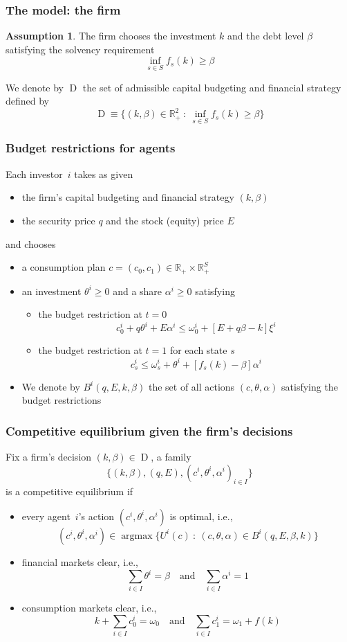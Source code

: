 \documentclass[blue]{beamer}
\def\R{\mathbb{R}}
\def\leq{\leqslant}
\def\geq{\geqslant}
\def\et{\quad \textrm{and} \quad}
\DeclareMathOperator\argmax{argmax}
\DeclareMathOperator\A{D}
\theoremstyle{definition}
\newtheorem*{assumption}{Assumption}
\theoremstyle{example}
\begin{document}
\begin{frame}\frametitle{The model: the firm}
\begin{assumption}
The firm chooses the investment $k$ and the debt level $\beta$ satisfying the solvency requirement
\[
\inf_{s\in S} f_s(k) \geq \beta
\]
\end{assumption}
We denote by $\A$ the set of admissible capital budgeting and financial strategy defined by
\[
\A \equiv \{(k,\beta) \in \R^2_+ \ \colon \ \inf_{s\in S} f_s(k) \geq \beta \}
\]
\end{frame}
\begin{frame}\frametitle{Budget restrictions for agents}
Each investor~$i$ takes as given
\begin{itemize}
\item the firm's capital budgeting and financial strategy $(k,\beta)$
\item the security price $q$ and the stock (equity) price $E$
\end{itemize}
and chooses
\begin{itemize}
\item a consumption plan $c=(c_0,c_1) \in \R_+ \times \R_+^S$
\item an investment $\theta^i\geq 0$ and a share $\alpha^i \geq 0$ satisfying
\begin{itemize}
\item the budget restriction at $t=0$
\[
c^i_0 + q \theta^i + E \alpha^i \leq \omega^i_0 + [E+q\beta - k] \xi^i
\]
\item the budget restriction at $t=1$ for each state $s$
\[
c^i_s \leq \omega^i_s + \theta^i + [f_s(k) - \beta] \alpha^i
\]
\end{itemize}
\item We denote by $B^i(q,E,k,\beta)$ the set of all actions $(c,\theta,\alpha)$ satisfying the budget restrictions
\end{itemize}
\end{frame}
\begin{frame}\frametitle{Competitive equilibrium given the firm's decisions}
Fix a firm's decision $(k,\beta) \in \A$, a family
\[
\{(k,\beta),(q,E),(c^i,\theta^i,\alpha^i)_{i\in I}\}
\]
is a competitive equilibrium if
\begin{itemize}
\item every agent~$i$'s action $(c^i,\theta^i,\alpha^i)$ is optimal, i.e.,
\[
(c^i,\theta^i,\alpha^i) \in \argmax \{U^i(c) \ \colon \ (c,\theta,\alpha) \in B^i(q,E,\beta,k) \}
\]
\item financial markets clear, i.e.,
\[
\sum_{i\in I} \theta^i = \beta \et \sum_{i\in I} \alpha^i = 1
\]
\item consumption markets clear, i.e.,
\[
k + \sum_{i\in I} c^i_0 = \omega_0 \et \sum_{i\in I} c^i_1 = \omega_1 + f(k)
\]
\end{itemize}
\end{frame}
\end{document}
